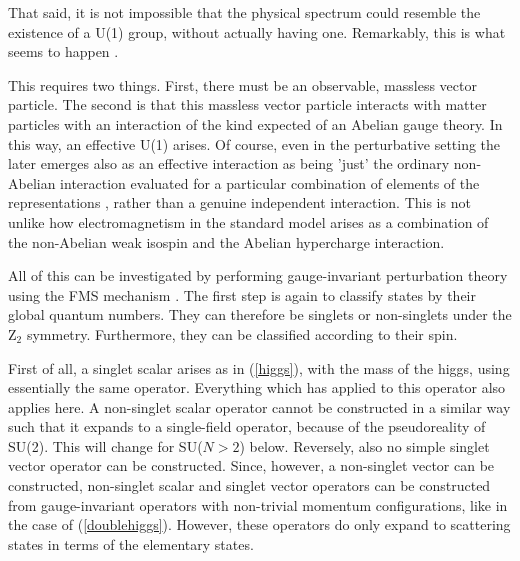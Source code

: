 \documentclass[final,12pt,3p,longtitle]{elsarticle}
\newcommand*{\pref}[1]{(\ref{#1})}
\newcommand*{\1}{1\!\!\!\bot}
\begin{document}
That said, it is not impossible that the physical spectrum could resemble the existence of a U(1) group, without actually having one. Remarkably, this is what seems to happen \cite{Maas:2017xzh}.

This requires two things. First, there must be an observable, massless vector particle. The second is that this massless vector particle interacts with matter particles with an interaction of the kind expected of an Abelian gauge theory. In this way, an effective U(1) arises. Of course, even in the perturbative setting the later emerges also as an effective interaction as being 'just' the ordinary non-Abelian interaction evaluated for a particular combination of elements of the representations \cite{Bohm:2001yx}, rather than a genuine independent interaction. This is not unlike how electromagnetism in the standard model arises as a combination of the non-Abelian weak isospin and the Abelian hypercharge interaction.

All of this can be investigated by performing gauge-invariant perturbation theory using the FMS mechanism \cite{Kondo:2016ywd,Maas:2017xzh}. The first step is again to classify states by their global quantum numbers. They can therefore be singlets or non-singlets under the Z$_2$ symmetry. Furthermore, they can be classified according to their spin.

First of all, a singlet scalar arises as in \pref{higgs}, with the mass of the higgs, using essentially the same operator. Everything which has applied to this operator also applies here. A non-singlet scalar operator cannot be constructed in a similar way such that it expands to a single-field operator, because of the pseudoreality of SU(2). This will change for SU($N>2$) below. Reversely, also no simple singlet vector operator can be constructed. Since, however, a non-singlet vector can be constructed, non-singlet scalar and singlet vector operators can be constructed from gauge-invariant operators with non-trivial momentum configurations, like in the case of \pref{doublehiggs}. However, these operators do only expand to scattering states in terms of the elementary states.
\end{document}
